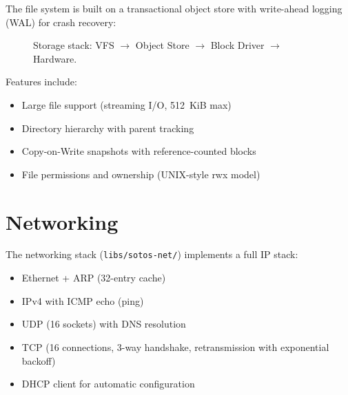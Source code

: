 \documentclass[11pt,letterpaper]{article}
\theoremstyle{definition}
\begin{document}
The file system is built on a transactional object store with write-ahead
logging (WAL) for crash recovery:

\begin{figure}[h]
\centering
{}
\caption{Storage stack: VFS $\to$ Object Store $\to$ Block Driver $\to$ Hardware.}
\label{fig:storage}
\end{figure}

Features include:
\begin{itemize}[nosep]
    \item Large file support (streaming I/O, 512~KiB max)
    \item Directory hierarchy with parent tracking
    \item Copy-on-Write snapshots with reference-counted blocks
    \item File permissions and ownership (UNIX-style rwx model)
\end{itemize}

\section{Networking}
\label{sec:net}

The networking stack (\texttt{libs/sotos-net/}) implements a full IP stack:

\begin{itemize}[nosep]
    \item Ethernet + ARP (32-entry cache)
    \item IPv4 with ICMP echo (ping)
    \item UDP (16 sockets) with DNS resolution
    \item TCP (16 connections, 3-way handshake, retransmission with
          exponential backoff)
    \item DHCP client for automatic configuration
\end{itemize}
\end{document}
